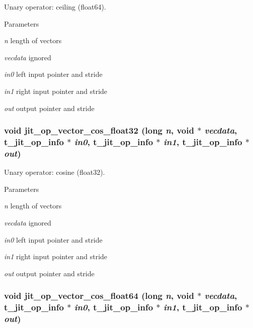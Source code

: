 Unary operator: ceiling (float64). 
\begin{DoxyParams}{Parameters}
\item[{\em n}]length of vectors \item[{\em vecdata}]ignored \item[{\em in0}]left input pointer and stride \item[{\em in1}]right input pointer and stride \item[{\em out}]output pointer and stride \end{DoxyParams}
\hypertarget{group__opvecmod_gaba8a6b1cff6bf9770ea3994d8be30e38}{
\subsubsection[{jit\_\-op\_\-vector\_\-cos\_\-float32}]{\setlength{\rightskip}{0pt plus 5cm}void jit\_\-op\_\-vector\_\-cos\_\-float32 (long {\em n}, \/  void $\ast$ {\em vecdata}, \/  {\bf t\_\-jit\_\-op\_\-info} $\ast$ {\em in0}, \/  {\bf t\_\-jit\_\-op\_\-info} $\ast$ {\em in1}, \/  {\bf t\_\-jit\_\-op\_\-info} $\ast$ {\em out})}}
\label{group__opvecmod_gaba8a6b1cff6bf9770ea3994d8be30e38}


Unary operator: cosine (float32). 
\begin{DoxyParams}{Parameters}
\item[{\em n}]length of vectors \item[{\em vecdata}]ignored \item[{\em in0}]left input pointer and stride \item[{\em in1}]right input pointer and stride \item[{\em out}]output pointer and stride \end{DoxyParams}
\hypertarget{group__opvecmod_ga2c87b24c84943232aa0dfdb15cf2ac4c}{
\subsubsection[{jit\_\-op\_\-vector\_\-cos\_\-float64}]{\setlength{\rightskip}{0pt plus 5cm}void jit\_\-op\_\-vector\_\-cos\_\-float64 (long {\em n}, \/  void $\ast$ {\em vecdata}, \/  {\bf t\_\-jit\_\-op\_\-info} $\ast$ {\em in0}, \/  {\bf t\_\-jit\_\-op\_\-info} $\ast$ {\em in1}, \/  {\bf t\_\-jit\_\-op\_\-info} $\ast$ {\em out})}}
\label{group__opvecmod_ga2c87b24c84943232aa0dfdb15cf2ac4c}


